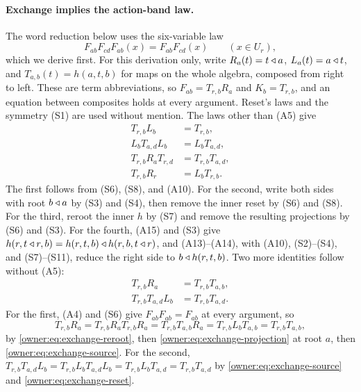 \paragraph{Exchange implies the action-band law.}
The word reduction below uses the six-variable law
\begin{equation}\label{owner:eq:action-band}
 F_{ab}F_{cd}F_{ab}(x)=F_{ab}F_{cd}(x)\qquad(x\in U_r),
\end{equation}
which we derive first. For this derivation only, write $R_a(t)=t\mathbin{\triangleleft} a$,
$L_a(t)=a\mathbin{\triangleleft} t$, and $T_{a,b}(t)=h(a,t,b)$ for maps on the whole algebra,
composed from right to left. These are term abbreviations, so
$F_{ab}=T_{r,b}R_a$ and $K_b=T_{r,b}$, and an equation between composites
holds at every argument. Reset's laws and the symmetry (S1) are used
without mention. The laws other than (A5) give
\begin{align}
 T_{r,b}L_b&=T_{r,b},\label{owner:eq:exchange-source}\\
 L_bT_{a,d}L_b&=L_bT_{a,d},\label{owner:eq:exchange-reset}\\
 T_{r,b}R_aT_{r,d}&=T_{r,b}T_{a,d},\label{owner:eq:exchange-reroot}\\
 T_{r,b}R_r&=L_bT_{r,b}.\label{owner:eq:exchange-projection}
\end{align}
The first follows from (S6), (S8), and (A10). For the second, write both
sides with root $b\mathbin{\triangleleft} a$ by (S3) and (S4), then remove the inner reset by (S6)
and (S8). For the third, reroot the inner $h$ by (S7) and remove the
resulting projections by (S6) and (S3). For the fourth, (A15) and (S3) give
$h(r,t\mathbin{\triangleleft} r,b)=h(r,t,b)\mathbin{\triangleleft} h(r,b,t\mathbin{\triangleleft} r)$, and (A13)--(A14), with
(A10), (S2)--(S4), and (S7)--(S11), reduce the right side to
$b\mathbin{\triangleleft} h(r,t,b)$. Two more identities follow without (A5):
\begin{align}
 T_{r,b}R_a&=T_{r,b}T_{a,b},\label{owner:eq:exchange-transport}\\
 T_{r,b}T_{a,d}L_b&=T_{r,b}T_{a,d}.\label{owner:eq:exchange-absorb}
\end{align}
For the first, (A4) and (S6) give $F_{ab}F_{ab}=F_{ab}$ at every argument,
so
\[
 T_{r,b}R_a=T_{r,b}R_aT_{r,b}R_a=T_{r,b}T_{a,b}R_a=T_{r,b}L_bT_{a,b}
 =T_{r,b}T_{a,b},
\]
by \eqref{owner:eq:exchange-reroot}, then
\eqref{owner:eq:exchange-projection} at root $a$, then
\eqref{owner:eq:exchange-source}. For the second,
$T_{r,b}T_{a,d}L_b=T_{r,b}L_bT_{a,d}L_b=T_{r,b}L_bT_{a,d}=T_{r,b}T_{a,d}$
by \eqref{owner:eq:exchange-source} and \eqref{owner:eq:exchange-reset}.

